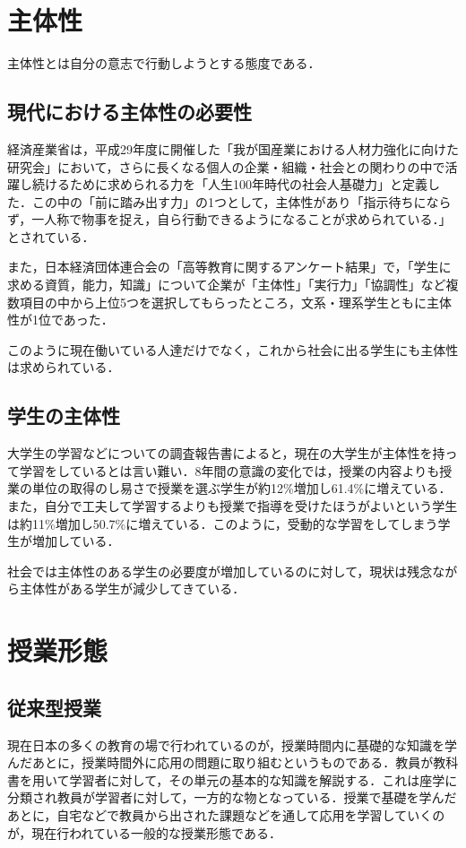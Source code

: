 \documentclass[a4j,11pt]{jsarticle}
\begin{document}
\section{主体性}
主体性とは自分の意志で行動しようとする態度である\cite{3}．

\subsection{現代における主体性の必要性}
経済産業省は，平成29年度に開催した「我が国産業における人材力強化に向けた研究会」において，さらに長くなる個人の企業・組織・社会との関わりの中で活躍し続けるために求められる力を「人生100年時代の社会人基礎力」と定義した\cite{4}．この中の「前に踏み出す力」の1つとして，主体性があり「指示待ちにならず，一人称で物事を捉え，自ら行動できるようになることが求められている．」とされている．

また，日本経済団体連合会の「高等教育に関するアンケート結果」\cite{5}で，「学生に求める資質，能力，知識」について企業が「主体性」「実行力」「協調性」など複数項目の中から上位5つを選択してもらったところ，文系・理系学生ともに主体性が1位であった．

このように現在働いている人達だけでなく，これから社会に出る学生にも主体性は求められている．

\subsection{学生の主体性}
大学生の学習などについての調査報告書\cite{6}によると，現在の大学生が主体性を持って学習をしているとは言い難い．8年間の意識の変化では，授業の内容よりも授業の単位の取得のし易さで授業を選ぶ学生が約12\%増加し61.4\%に増えている．また，自分で工夫して学習するよりも授業で指導を受けたほうがよいという学生は約11\%増加し50.7\%に増えている．このように，受動的な学習をしてしまう学生が増加している．

社会では主体性のある学生の必要度が増加しているのに対して，現状は残念ながら主体性がある学生が減少してきている．



\newpage

\section{授業形態}
\subsection{従来型授業}
現在日本の多くの教育の場で行われているのが，授業時間内に基礎的な知識を学んだあとに，授業時間外に応用の問題に取り組むというものである．教員が教科書を用いて学習者に対して，その単元の基本的な知識を解説する．これは座学に分類され教員が学習者に対して，一方的な物となっている．授業で基礎を学んだあとに，自宅などで教員から出された課題などを通して応用を学習していくのが，現在行われている一般的な授業形態である．
\end{document}
